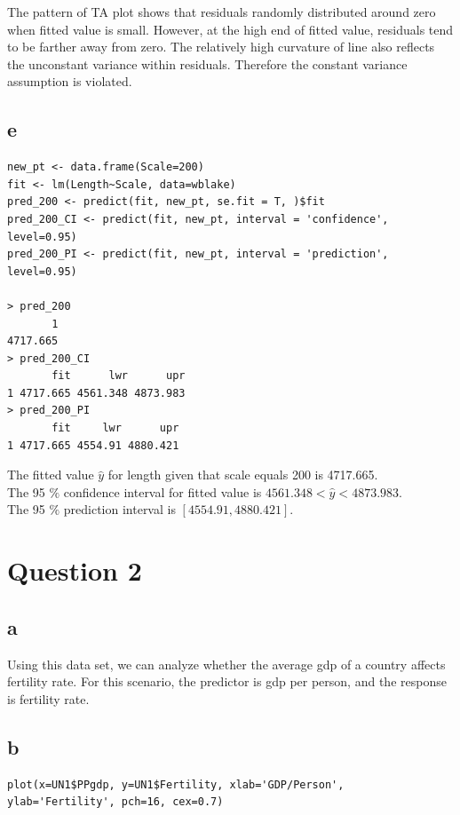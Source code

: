 \documentclass[11pt,letterpaper]{article}
\begin{document}
\noindent The pattern of TA plot shows that residuals randomly distributed around zero when fitted value is small. However, at the high end of fitted value, residuals tend to be farther away from zero. The relatively high curvature of line also reflects the unconstant variance within residuals. Therefore the constant variance assumption is violated. 

\subsection*{e}
\begin{verbatim}
new_pt <- data.frame(Scale=200)
fit <- lm(Length~Scale, data=wblake)
pred_200 <- predict(fit, new_pt, se.fit = T, )$fit
pred_200_CI <- predict(fit, new_pt, interval = 'confidence', level=0.95)
pred_200_PI <- predict(fit, new_pt, interval = 'prediction', level=0.95)

> pred_200
       1 
4717.665 
> pred_200_CI
       fit      lwr      upr
1 4717.665 4561.348 4873.983
> pred_200_PI
       fit     lwr      upr
1 4717.665 4554.91 4880.421
\end{verbatim}

\noindent The fitted value $\hat{y}$ for length given that scale equals 200 is 4717.665. \\

\noindent The 95 $\%$ confidence interval for fitted value is $4561.348 < \hat{y} < 4873.983$. \\

\noindent The 95 $\%$ prediction interval is $[4554.91, 4880.421]$.

\newpage
\section*{Question 2}
\subsection*{a}
\noindent Using this data set, we can analyze whether the average gdp of a country affects fertility rate. For this scenario, the predictor is gdp per person, and the response is fertility rate. 

\subsection*{b}
\begin{verbatim}
plot(x=UN1$PPgdp, y=UN1$Fertility, xlab='GDP/Person', ylab='Fertility', pch=16, cex=0.7) 
\end{verbatim}
\end{document}
